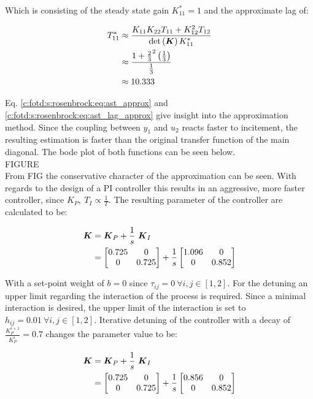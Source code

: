 Which is consisting of the steady state gain $K_{11}^* = 1$ and the approximate lag of:

\begin{align}
\begin{split}
T_{11}^* & \approx \frac{K_{11} K_{22} T_{11} + K_{12}^2 T_{12}}{\det \left( \mbox{\boldmath$K$}\right) K_{11}^*} \\
& \approx \frac{1+ \frac{2}{3}^2 \left(\frac{1}{3} \right)}{\frac{1}{3}} \\
& \approx 10.333
\end{split}
\label{c:fotd:s:rosenbrock:eq:ast_lag_approx}
\end{align}

Eq. \ref{c:fotd:s:rosenbrock:eq:ast_approx} and \ref{c:fotd:s:rosenbrock:eq:ast_lag_approx} give insight into the approximation method. Since the coupling between $y_1$ and $u_2$ reacts faster to incitement, the resulting estimation is faster than the original transfer function of the main diagonal. The bode plot of both functions can be seen below.\\

FIGURE\\

From FIG the conservative character of the approximation can be seen. With regards to the design of a PI controller this results in an aggressive, more faster controller, since $K_P,~T_I \propto \frac{1}{T}$. The resulting parameter of the controller are calculated to be:

\begin{align}
\mbox{\boldmath$K$} &= \mbox{\boldmath$K$}_P + \frac{1}{s}~ \mbox{\boldmath$K$}_I\\
&= \begin{bmatrix}
0.725 & 0 \\
0 & 0.725
\end{bmatrix}
+ \frac{1}{s}\begin{bmatrix}
1.096 & 0 \\
0 & 0.852
\end{bmatrix}
\end{align}

With a set-point weight of $b = 0$ since $\tau_{ij} = 0 ~\forall i,j \in [1,2]$. For the detuning an upper limit regarding the interaction of the process is required. Since a minimal interaction is desired, the upper limit of the interaction is set to $h_{ij} = 0.01 ~ \forall i,j \in [1,2]$. Iterative detuning of the controller with a decay of $\frac{K_P^{i+1}}{K_P^{i}} = 0.7 $ changes the parameter value to be:

\begin{align}
\mbox{\boldmath$K$} &= \mbox{\boldmath$K$}_P + \frac{1}{s}~ \mbox{\boldmath$K$}_I\\
&= \begin{bmatrix}
0.725 & 0 \\
0 & 0.725
\end{bmatrix}
+ \frac{1}{s}\begin{bmatrix}
0.856 & 0 \\
0 & 0.852
\end{bmatrix}
\end{align}

